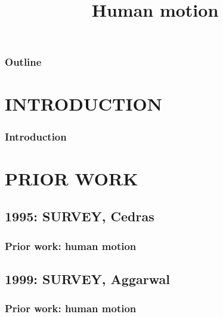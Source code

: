 
\title{Human motion}
\begin{frame}[plain]\logoTechTower
	\titlepage
\end{frame}

\begin{frame}
\frametitle{Outline}
\logoCSIPCPL\logoTechTower
	\setcounter{tocdepth}{1}	
	\tableofcontents
\end{frame}




\section{INTRODUCTION}
\begin{frame}
\frametitle{Introduction}
\framesubtitle{}
\logoCSIPCPL\mypagenum
\end{frame}


\section{PRIOR WORK}

\subsection{1995: SURVEY, Cedras}
\begin{frame}
\frametitle{Prior work: human motion}
\framesubtitle{}
\mypagenum
{}
\end{frame}



\subsection{1999: SURVEY, Aggarwal}
\begin{frame}
\frametitle{Prior work: human motion}
\framesubtitle{}
\mypagenum
{}
\end{frame}


